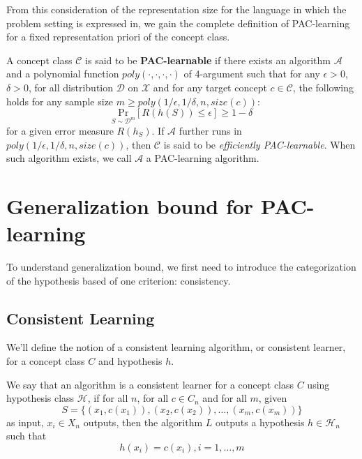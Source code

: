 From this consideration of the representation size for the language in which the problem setting is expressed in, we gain the complete definition of PAC-learning for a fixed representation priori of the concept class. 

\begin{definition}
    A concept class $\mathcal{C}$ is said to be \textbf{PAC-learnable} if there exists an algorithm $\mathcal{A}$ and a polynomial function $poly(\cdot,\cdot,\cdot,\cdot)$ of 4-argument such that for any $\epsilon>0$, $\delta>0$, for all distribution $\mathcal{D}$ on $\mathcal{X}$ and for any target concept $c\in\mathcal{C}$, the following holds for any sample size $m\geq poly(1/\epsilon,1/\delta,n,size(c))$: $$\underset{S\sim \mathcal{D}^{m}}{\mathrm{Pr}}\left[ R(h(S))\leq \epsilon \right]\geq 1-\delta$$
    for a given error measure $R(h_{S})$. If $\mathcal{A}$ further runs in $poly(1/\epsilon,1/\delta,n,size(c))$, then $\mathcal{C}$ is said to be \textit{efficiently PAC-learnable}. When such algorithm exists, we call $\mathcal{A}$ a PAC-learning algorithm. 
\end{definition}



\section{Generalization bound for PAC-learning}

To understand generalization bound, we first need to introduce the categorization of the hypothesis based of one criterion: consistency. 

\subsection{Consistent Learning}

We'll define the notion of a consistent learning algorithm, or consistent learner, for a concept class $C$ and hypothesis $h$. 
\begin{definition}
    We say that an algorithm is a consistent learner for a concept class $C$ using hypothesis class $\mathcal{H}$, if for all $n$, for all $c\in C_n$ and for all $m$, given 
    \begin{equation*}
        S = \{ (x_1, c(x_1)) , (x_2, c(x_2)) ,\dots, (x_m, c(x_m))  \} 
    \end{equation*}
    as input, $x_i \in X_n$ outputs, then the algorithm $L$ outputs a hypothesis $h\in \mathcal{H}_n$ such that $$h(x_i) = c(x_i) , i = 1,\dots,m$$ 
\end{definition}

